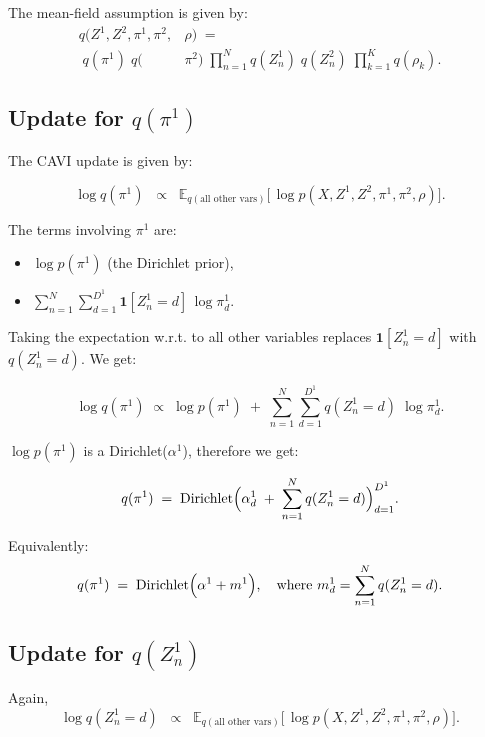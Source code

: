 \documentclass{article}
\begin{document}
\begin{multicols}{2}
    The mean-field assumption is given by:
    \begin{align*}
    q(Z^1, Z^2, \pi^1, \pi^2, &\rho)
    \;=\\\;
    q(\pi^1)\;q(&\pi^2)\;\prod_{n=1}^N q(Z_n^1)\;q(Z_n^2)\;\prod_{k=1}^K q(\rho_k).
    \end{align*}

    \subsection*{Update for \(q(\pi^1)\)}

    The CAVI update is given by:

    \[
    \log q(\pi^1)
    \;\;\propto\;\;
    \mathbb{E}_{q(\text{all other vars})}\bigl[\,
    \log p(X,Z^1,Z^2,\pi^1,\pi^2,\rho)
    \bigr].
    \]

    The terms involving \(\pi^1\) are:
    \begin{itemize}
        \item \(\log p(\pi^1)\) (the Dirichlet prior),
        \item \(\sum_{n=1}^N \sum_{d=1}^{D^1} \mathbf{1}[Z_n^1=d]\,\log \pi^1_d\).
    \end{itemize}

    Taking the expectation w.r.t. to all other variables replaces \(\mathbf{1}[Z_n^1=d]\) with \(q(Z_n^1=d)\).  We get:

    \[
    \log q(\pi^1)
    \;\propto\;
    \log p(\pi^1)
    \;+\;
    \sum_{n=1}^N
    \sum_{d=1}^{D^1} 
    q(Z_n^1 = d)\;\log \pi^1_d.
    \]

    \(\log p(\pi^1)\) is a Dirichlet(\(\alpha^1\)), therefore we get:

    \[
    q(\pi^1)
    \;=\;
    \mathrm{Dirichlet}
    \Bigl(
    \alpha^1_d \;+\;\sum_{n=1}^N q(Z_n^1 = d)
    \Bigr)_{d=1}^{D^1}.
    \]

    Equivalently:  
    \[
    q(\pi^1) 
    \;=\; 
    \mathrm{Dirichlet}\Bigl(\alpha^1 + m^1\Bigr),
    \quad\text{where } m^1_d = \sum_{n=1}^N q(Z_n^1 = d).
    \]

    \subsection*{Update for \(q(Z_n^1)\)}

    Again,  
    \[
    \log q(Z_n^1 = d)
    \;\;\propto\;\;
    \mathbb{E}_{q(\text{all other vars})}\bigl[\,
    \log p(X,Z^1,Z^2,\pi^1,\pi^2,\rho)
    \bigr].
    \]


\end{multicols}
\end{document}
